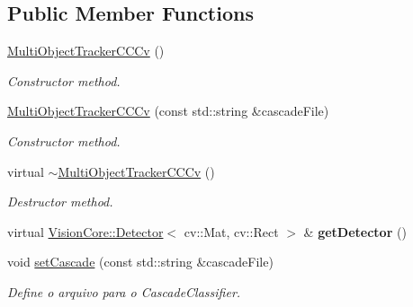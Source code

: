 \subsection*{Public Member Functions}
\begin{DoxyCompactItemize}
\item 
\hypertarget{class_viscv_1_1_multi_object_tracker_c_c_cv_adbe09f2c1c4520283195921f4c90afa7}{}\hyperlink{class_viscv_1_1_multi_object_tracker_c_c_cv_adbe09f2c1c4520283195921f4c90afa7}{Multi\+Object\+Tracker\+C\+C\+Cv} ()\label{class_viscv_1_1_multi_object_tracker_c_c_cv_adbe09f2c1c4520283195921f4c90afa7}

\begin{DoxyCompactList}\small\item\em Constructor method. \end{DoxyCompactList}\item 
\hypertarget{class_viscv_1_1_multi_object_tracker_c_c_cv_a341715236b1a2c1a6b156f1b8d2da7fc}{}\hyperlink{class_viscv_1_1_multi_object_tracker_c_c_cv_a341715236b1a2c1a6b156f1b8d2da7fc}{Multi\+Object\+Tracker\+C\+C\+Cv} (const std\+::string \&cascade\+File)\label{class_viscv_1_1_multi_object_tracker_c_c_cv_a341715236b1a2c1a6b156f1b8d2da7fc}

\begin{DoxyCompactList}\small\item\em Constructor method. \end{DoxyCompactList}\item 
\hypertarget{class_viscv_1_1_multi_object_tracker_c_c_cv_a750f0940ea132b159ddf0c2d1b5ebf05}{}virtual \hyperlink{class_viscv_1_1_multi_object_tracker_c_c_cv_a750f0940ea132b159ddf0c2d1b5ebf05}{$\sim$\+Multi\+Object\+Tracker\+C\+C\+Cv} ()\label{class_viscv_1_1_multi_object_tracker_c_c_cv_a750f0940ea132b159ddf0c2d1b5ebf05}

\begin{DoxyCompactList}\small\item\em Destructor method. \end{DoxyCompactList}\item 
\hypertarget{class_viscv_1_1_multi_object_tracker_c_c_cv_a4be522d94365bcd7a34b3e3f596e992c}{}virtual \hyperlink{class_vision_core_1_1_interfaces_1_1_detector}{Vision\+Core\+::\+Detector}$<$ cv\+::\+Mat, cv\+::\+Rect $>$ \& {\bfseries get\+Detector} ()\label{class_viscv_1_1_multi_object_tracker_c_c_cv_a4be522d94365bcd7a34b3e3f596e992c}

\item 
\hypertarget{class_viscv_1_1_multi_object_tracker_c_c_cv_a9561a1a6c14783698af2260d91872f31}{}void \hyperlink{class_viscv_1_1_multi_object_tracker_c_c_cv_a9561a1a6c14783698af2260d91872f31}{set\+Cascade} (const std\+::string \&cascade\+File)\label{class_viscv_1_1_multi_object_tracker_c_c_cv_a9561a1a6c14783698af2260d91872f31}

\begin{DoxyCompactList}\small\item\em Define o arquivo para o Cascade\+Classifier. \end{DoxyCompactList}\end{DoxyCompactItemize}
